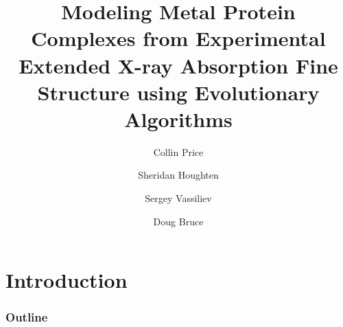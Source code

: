 \documentclass[10pt]{beamer}
\begin{document}
\title[Modeling OEC using EXAFS]{Modeling Metal Protein Complexes from Experimental Extended X-ray Absorption Fine Structure using Evolutionary Algorithms}

\author[Price \and Houghten \and Vassiliev \and Bruce]{
	Collin Price
	\and
	Sheridan Houghten
	\and
	Sergey Vassiliev
	\and
	Doug Bruce
}




\begin{frame}
	\titlepage
\end{frame}

\section{Introduction}

\begin{frame}
	\frametitle{Outline}
	\tableofcontents
\end{frame}
\end{document}
